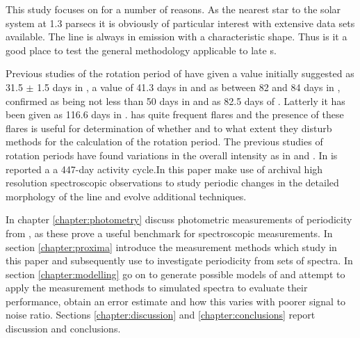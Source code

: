 This study focuses on {\prox} for a number of reasons. As the nearest star to the solar system at 1.3 parsecs it is
obviously of particular interest with extensive data sets available. The {\ha} line is always in emission with a
characteristic shape. Thus is it a good place to test the general methodology applicable to late \rdwarf s.

Previous studies of the rotation period of {\prox} have given a value initially suggested as 31.5 $\pm$ 1.5 days in
\citet{guinan96}, a value of 41.3 days in \citet{benedict93} and as between 82 and 84 days in
\citealt{benedict92,benedict98}, confirmed as being not less than 50 days in \citet{kurster99} and as 82.5 days of
\citet{kiraga07}. Latterly it has been given as 116.6 days in \citet[Table 3]{suarezmascareno15}.  {\prox} has quite
frequent flares and the presence of these flares is useful for determination of whether and to what extent they disturb
methods for the calculation of the rotation period. The previous studies of rotation periods have found variations in
the overall intensity as in \citet{benedict98} and \citet{kiraga07}. In \citet{cincunegui07} is reported a a 447-day
activity cycle.In this paper {\Firstp} make use of archival high resolution spectroscopic observations to study periodic
changes in the detailed morphology of the {\ha} line and evolve additional techniques.

In chapter \ref{chapter:photometry} {\Firstp} discuss photometric measurements of periodicity from \prox, as these prove a
useful benchmark for spectroscopic measurements. In section \ref{chapter:proxima} {\Firstp} introduce the measurement
methods which {\Firstp} study in this paper and subsequently use to investigate periodicity from sets of spectra. In
section \ref{chapter:modelling} {\Firstp} go on to generate possible models of {\prox} and attempt to apply the
measurement methods to simulated spectra to evaluate their performance, obtain an error estimate and how this varies
with poorer signal to noise ratio. Sections \ref{chapter:discussion} and \ref{chapter:conclusions} report {\Firstposs}
discussion and conclusions.

